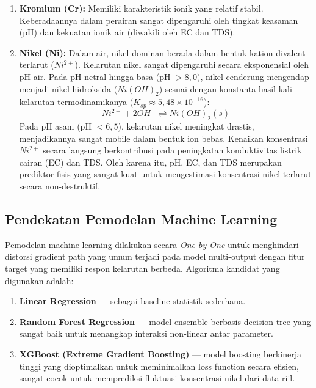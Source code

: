 \documentclass[12pt,a4paper]{article}
\begin{document}
\begin{enumerate}
    \item \textbf{Kromium (Cr):} Memiliki karakteristik ionik yang relatif stabil. Keberadaannya dalam perairan sangat dipengaruhi oleh tingkat keasaman (pH) dan kekuatan ionik air (diwakili oleh EC dan TDS).
    \item \textbf{Nikel (Ni):} Dalam air, nikel dominan berada dalam bentuk kation divalent terlarut ($Ni^{2+}$). Kelarutan nikel sangat dipengaruhi secara eksponensial oleh pH air. Pada pH netral hingga basa (pH $> 8{,}0$), nikel cenderung mengendap menjadi nikel hidroksida ($Ni(OH)_2$) sesuai dengan konstanta hasil kali kelarutan termodinamikanya ($K_{sp} \approx 5{,}48 \times 10^{-16}$):
    \begin{equation}
    Ni^{2+} + 2OH^- \rightleftharpoons Ni(OH)_2(s)
    \end{equation}
    Pada pH asam (pH $< 6{,}5$), kelarutan nikel meningkat drastis, menjadikannya sangat mobile dalam bentuk ion bebas. Kenaikan konsentrasi $Ni^{2+}$ secara langsung berkontribusi pada peningkatan konduktivitas listrik cairan (EC) dan TDS. Oleh karena itu, pH, EC, dan TDS merupakan prediktor fisis yang sangat kuat untuk mengestimasi konsentrasi nikel terlarut secara non-destruktif.
\end{enumerate}

\subsection{Pendekatan Pemodelan Machine Learning}

Pemodelan machine learning dilakukan secara \textit{One-by-One} untuk menghindari distorsi gradient path yang umum terjadi pada model multi-output dengan fitur target yang memiliki respon kelarutan berbeda. Algoritma kandidat yang digunakan adalah:

\begin{enumerate}
    \item \textbf{Linear Regression} --- sebagai baseline statistik sederhana.
    \item \textbf{Random Forest Regression} --- model ensemble berbasis decision tree yang sangat baik untuk menangkap interaksi non-linear antar parameter.
    \item \textbf{XGBoost (Extreme Gradient Boosting)} --- model boosting berkinerja tinggi yang dioptimalkan untuk meminimalkan loss function secara efisien, sangat cocok untuk memprediksi fluktuasi konsentrasi nikel dari data riil.
\end{enumerate}
\end{document}
